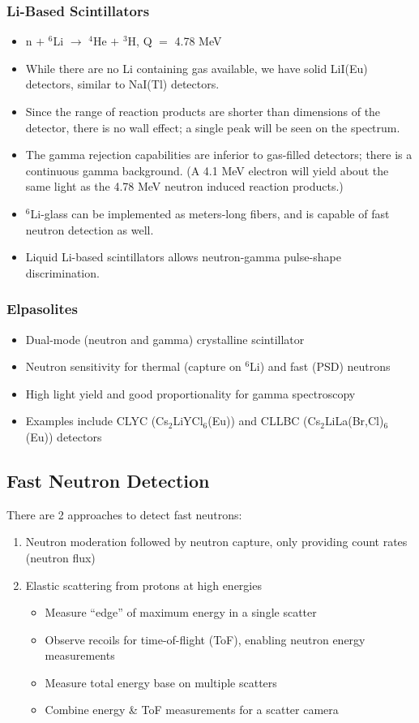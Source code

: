 \subsubsection{Li-Based Scintillators}
\begin{itemize}
    \item n $+$ $^6$Li $\rightarrow$ $^4$He $+$ $^3$H, Q $=$ 4.78 MeV
    \item While there are no Li containing gas available, we have solid LiI(Eu) detectors, similar to NaI(Tl) detectors.
    \item Since the range of reaction products are shorter than dimensions of the detector, there is no wall effect; a single peak will be seen on the spectrum.
    \item The gamma rejection capabilities are inferior to gas-filled detectors; there is a continuous gamma background. (A 4.1 MeV electron will yield about the same light as the 4.78 MeV neutron induced reaction products.)
    \item $^6$Li-glass can be implemented as meters-long fibers, and is capable of fast neutron detection as well. 
    \item Liquid Li-based scintillators allows neutron-gamma pulse-shape discrimination.
\end{itemize}
\subsubsection{Elpasolites}
\begin{itemize}
    \item Dual-mode (neutron and gamma) crystalline scintillator
    \item Neutron sensitivity for thermal (capture on $^6$Li) and fast (PSD) neutrons
    \item High light yield and good proportionality for gamma spectroscopy
    \item Examples include CLYC (Cs$_2$LiYCl$_6$(Eu)) and CLLBC (Cs$_2$LiLa(Br,Cl)$_6$(Eu)) detectors
\end{itemize}

\subsection{Fast Neutron Detection}
There are 2 approaches to detect fast neutrons:
\begin{enumerate}
    \item Neutron moderation followed by neutron capture, only providing count rates (neutron flux)
    \item Elastic scattering from protons at high energies
    \begin{itemize}
        \item Measure ``edge'' of maximum energy in a single scatter
        \item Observe recoils for time-of-flight (ToF), enabling neutron energy measurements
        \item Measure total energy base on multiple scatters
        \item Combine energy \& ToF measurements for a scatter camera
    \end{itemize}
\end{enumerate}
